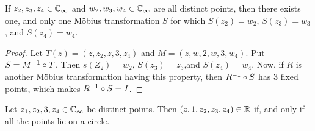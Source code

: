 \begin{lemma}\label{3.3.6}
    If $z_2,z_3,z_4 \in \mathbb{C}_\infty$ and $w_2,w_3,w_4 \in \mathbb{C}_\infty$ are all
    distinct points, then there exists one, and only one M\"obius transformation
    $S$ for which $S(z_2)=w_2$, $S(z_3)=w_3$, and $S(z_4)=w_4$.
\end{lemma}
\begin{proof}
    Let $T(z)=(z,z_2,z,3,z_4)$ and $M=(z,w,2,w,3,w_4)$. Put $S=M^{-1} \circ T$.
    Then $s(Z_2)=w_2$, $S(z_3)=z_3$,and $S(z_4)=w_4$. Now, if $R$ is another
    M\"obius transformation having this property, then  $R^{-1} \circ S$ has
    $3$ fixed points, which makes $R^{-1} \circ S=I$.
\end{proof}

\begin{lemma}\label{3.3.7}
    Let $z_1,z_2,3,z_4 \in \mathbb{C}_\infty$ be distinct points. Then
    $(z,1,z_2,z_3,z_4) \in \mathbb{R}$ if, and only if all the points lie on a circle.
\end{lemma}
